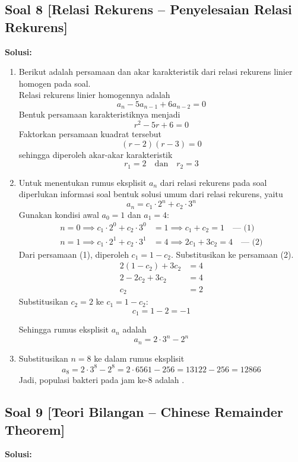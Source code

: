 \documentclass[12pt,a4paper]{article}
\begin{document}
\subsection*{Soal 8 [Relasi Rekurens -- Penyelesaian Relasi Rekurens]}
\textbf{Solusi:}

\begin{enumerate}[label=(\alph*)]
    \item Berikut adalah persamaan dan akar karakteristik dari relasi rekurens linier homogen pada soal.\\
    Relasi rekurens linier homogennya adalah
    \[ a_n - 5a_{n-1} + 6a_{n-2} = 0 \]
    Bentuk persamaan karakteristiknya menjadi
    \[ r^2 - 5r + 6 = 0 \]
    Faktorkan persamaan kuadrat tersebut
    \[ (r - 2)(r - 3) = 0 \]
    sehingga diperoleh akar-akar karakteristik
    \[ \boxed{r_1 = 2} \quad \text{dan} \quad \boxed{r_2 = 3} \]

    \item Untuk menentukan rumus eksplisit $a_n$ dari relasi rekurens pada soal diperlukan informasi soal bentuk solusi umum dari relasi rekurens, yaitu
    \[ a_n = c_1 \cdot 2^n + c_2 \cdot 3^n \]
    Gunakan kondisi awal $a_0 = 1$ dan $a_1 = 4$:
    \begin{align*}
        n = 0 \implies c_1 \cdot 2^0 + c_2 \cdot 3^0 &= 1 \implies c_1 + c_2 = 1 \quad \text{--- (1)} \\
        n = 1 \implies c_1 \cdot 2^1 + c_2 \cdot 3^1 &= 4 \implies 2c_1 + 3c_2 = 4 \quad \text{--- (2)}
    \end{align*}
    Dari persamaan (1), diperoleh $c_1 = 1 - c_2$. Substitusikan ke persamaan (2).
    \begin{align*}
        2(1 - c_2) + 3c_2 &= 4 \\
        2 - 2c_2 + 3c_2 &= 4 \\
        c_2 &= 2
    \end{align*}
    Substitusikan $c_2 = 2$ ke $c_1 = 1 - c_2$:
    \[ c_1 = 1 - 2 = -1 \]
    
    Sehingga rumus eksplisit $a_n$ adalah
    \[ \boxed{a_n = 2 \cdot 3^n - 2^n} \]

    \item Substitusikan $n = 8$ ke dalam rumus eksplisit
    \[ a_8 = 2 \cdot 3^8 - 2^8 = 2 \cdot 6561 - 256 = 13122 - 256 = 12866 \]
    Jadi, populasi bakteri pada jam ke-8 adalah .
\end{enumerate}

\subsection*{Soal 9 [Teori Bilangan -- Chinese Remainder Theorem]}
\textbf{Solusi:}
\end{document}
